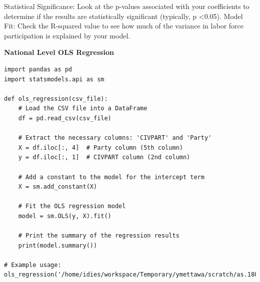 Statistical Significance: Look at the p-values associated with your coefficients to determine if the results are statistically significant (typically, p \textless  0.05).
Model Fit: Check the R-squared value to see how much of the variance in labor force participation is explained by your model.

\textbf{National Level OLS Regression}

\begin{verbatim}
import pandas as pd
import statsmodels.api as sm

def ols_regression(csv_file):
    # Load the CSV file into a DataFrame
    df = pd.read_csv(csv_file)

    # Extract the necessary columns: 'CIVPART' and 'Party'
    X = df.iloc[:, 4]  # Party column (5th column)
    y = df.iloc[:, 1]  # CIVPART column (2nd column)

    # Add a constant to the model for the intercept term
    X = sm.add_constant(X)

    # Fit the OLS regression model
    model = sm.OLS(y, X).fit()

    # Print the summary of the regression results
    print(model.summary())

# Example usage:
ols_regression('/home/idies/workspace/Temporary/ymettawa/scratch/as.180.369/contrib/yazzymettawa/Paper_Final/Data/nationalLFPR.csv')
\end{verbatim}


